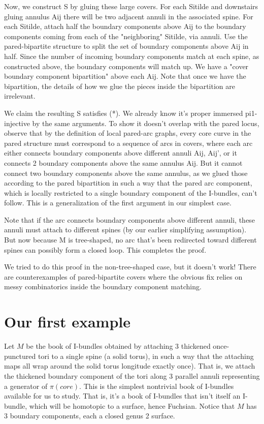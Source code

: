 \documentclass[12pt]{amsart}
\theoremstyle{definition}
\begin{document}
Now, we construct S by gluing these large covers. For each Sitilde and
downstairs gluing annulus Aij there will be two adjacent annuli in the
associated spine. For each Sitilde, attach half the boundary components above
Aij to the boundary components coming from each of the "neighboring" Sitilde,
via annuli. Use the pared-bipartite structure to split the set of boundary
components above Aij in half. Since the number of incoming boundary components
match at each spine, as constructed above, the boundary components will match
up. We have a "cover boundary component bipartition" above each Aij. Note that
once we have the bipartition, the details of how we glue the pieces inside the
bipartition are irrelevant.

We claim the resulting S satisfies (*). We already know it's proper immersed
pi1-injective by the same arguments. To show it doesn't overlap with the pared
locus, observe that by the definition of local pared-arc graphs, every core
curve in the pared structure must correspond to a sequence of arcs in covers,
where each arc either connects boundary components above different annuli Aij,
Aij', or it connects 2 boundary components above the same annulus Aij. But it
cannot connect two boundary components above the same annulus, as we glued
those according to the pared bipartition in such a way that the pared arc
component, which is locally restricted to a single boundary component of the
I-bundles, can't follow. This is a generalization of the first argument in our
simplest case.

Note that if the arc connects boundary components above different annuli, these
annuli must attach to different spines (by our earlier simplifying assumption).
But now because M is tree-shaped, no arc that's been redirected toward
different spines can possibly form a closed loop. This completes the proof.

We tried to do this proof in the non-tree-shaped case, but it doesn't work!
There are counterexamples of pared-bipartite covers where the obvious fix
relies on messy combinatorics inside the boundary component matching.

\section{Our first example}

Let $M$ be the book of I-bundles obtained by attaching 3 thickened
once-punctured tori to a single spine (a solid torus), in such a way that the
attaching maps all wrap around the solid torus longitude exactly once). That
is, we attach the thickened boundary component of the tori along 3 parallel
annuli representing a generator of $\pi(core)$. This is the simplest nontrivial
book of I-bundles available for us to study. That is, it's a book of I-bundles
that isn't itself an I-bundle, which will be homotopic to a surface, hence
Fuchsian. Notice that $M$ has 3 boundary components, each a closed genus
2 surface.
\end{document}
